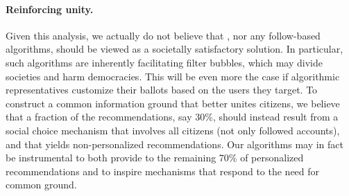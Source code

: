 \paragraph{Reinforcing unity.}
Given this analysis, we actually do not believe that \Veche{},
nor any follow-based algorithms,
should be viewed as a societally satisfactory solution.
In particular, such algorithms are inherently facilitating filter bubbles,
which may divide societies and harm democracies.
This will be even more the case if algorithmic representatives customize their ballots
based on the users they target.
To construct a common information ground that better unites citizens,
we believe that a fraction of the recommendations, say 30\%,
should instead result from a social choice mechanism that involves all citizens
(not only followed accounts),
and that yields non-personalized recommendations.
Our algorithms may in fact be instrumental
to both provide to the remaining 70\% of personalized recommendations
and to inspire mechanisms that respond to the need for common ground.
